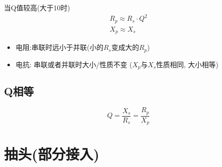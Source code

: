 \documentclass[a4paper]{report}
\begin{document}
当Q值较高(大于10时)
\begin{align*}
  R_p\approx R_s\cdot Q^2\\
  X_p\approx X_s
\end{align*}

\begin{itemize}
  \item 电阻:串联时远小于并联(小的$R_s$变成大的$R_p$)
  \item 电抗: 串联或者并联时大小/性质不变 ($X_p$与$X_s$性质相同, 大小相等)
\end{itemize}

\subsection{Q相等} 
$$Q=\frac{X_s}{R_s}=\frac{R_p}{X_p}$$

\section{抽头(部分接入)}
\end{document}
